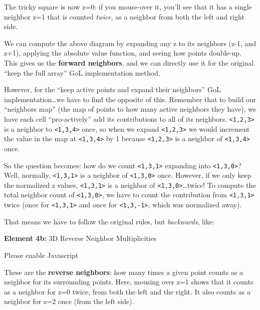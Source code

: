 \documentclass[]{article}
\begin{document}
The tricky square is now z=0: if you mouse-over it, you'll see that it has a
single neighbor z=1 that is counted \emph{twice}, as a neighbor from both the
left and right side.

We can compute the above diagram by expanding any z to its neighbors (z-1, and
z+1), applying the absolute value function, and seeing how points double-up.
This gives us the \textbf{forward neighbors}, and we can directly use it for the
original ``keep the full array'' GoL implementation method.

However, for the ``keep active points and expand their neighbors'' GoL
implementation\ldots we have to find the opposite of this. Remember that to
build our ``neighbors map'' (the map of points to how many active neighbors they
have), we have each cell ``pro-actively'' add its contributions to all of its
neighbors. \texttt{\textless{}1,2,3\textgreater{}} is a neighbor to
\texttt{\textless{}1,3,4\textgreater{}} once, so when we expand
\texttt{\textless{}1,2,3\textgreater{}} we would increment the value in the map
at \texttt{\textless{}1,3,4\textgreater{}} by 1 because
\texttt{\textless{}1,2,3\textgreater{}} is a neighbor of
\texttt{\textless{}1,3,4\textgreater{}} once.

So the question becomes: how do we count \texttt{\textless{}1,3,1\textgreater{}}
expanding into \texttt{\textless{}1,3,0\textgreater{}}? Well, normally,
\texttt{\textless{}1,3,1\textgreater{}} is a neighbor of
\texttt{\textless{}1,3,0\textgreater{}} once. However, if we only keep the
normalized z values, \texttt{\textless{}1,3,1\textgreater{}} is a neighbor of
\texttt{\textless{}1,3,0\textgreater{}}\ldots twice! To compute the total
neighbor count of \texttt{\textless{}1,3,0\textgreater{}}, we have to count the
contribution from \texttt{\textless{}1,3,1\textgreater{}} twice (once for
\texttt{\textless{}1,3,1\textgreater{}} and once for
\texttt{\textless{}1,3,-1\textgreater{}}, which was normalized away).

That means we have to follow the original rules, but \emph{backwards}, like:

\leavevmode\hypertarget{golSyms3DReverse}{}%
\textbf{Element 4b:} 3D Reverse Neighbor Multiplicities

\leavevmode\hypertarget{golSyms3DReverseCont}{}%
Please enable Javascript

These are the \textbf{reverse neighbors}: how many times a given point counts as
a neighbor for its surrounding points. Here, mousing over z=1 shows that it
counts as a neighbor for z=0 twice, from both the left and the right. It also
counts as a neighbor for z=2 once (from the left side).
\end{document}
